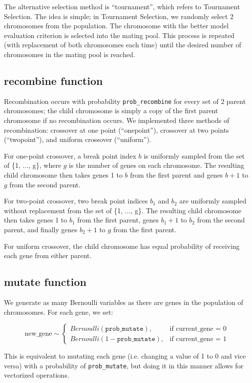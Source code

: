 \documentclass[11pt]{article}
\begin{document}
The alternative selection method is ``tournament'', which refers to Tournament Selection. The idea is simple; in Tournament Selection, we randomly select 2 chromosomes from the population. The chromosome with the better model evaluation criterion is selected into the mating pool. This process is repeated (with replacement of both chromosomes each time) until the desired number of chromosomes in the mating pool is reached.

\subsection*{recombine function}
Recombination occurs with probability \texttt{prob\_recombine} for every set of 2 parent chromosomes; the child chromosome is simply a copy of the first parent chromosome if no recombination occurs. We implemented three methods of recombination: crossover at one point (``onepoint''), crossover at two points (``twopoint''), and uniform crossover (``uniform'').

For one-point crossover, a break point index $b$ is uniformly sampled from the set of \{1, ..., g\}, where $g$ is the number of genes on each chromosome. The resulting child chromosome then takes genes 1 to $b$ from the first parent and genes $b+1$ to $g$ from the second parent.

For two-point crossover, two break point indices $b_1$ and $b_2$ are uniformly sampled without replacement from the set of \{1, ..., g\}. The resulting child chromosome then takes genes 1 to $b_1$ from the first parent, genes $b_1+1$ to $b_2$ from the second parent, and finally genes $b_2+1$ to $g$ from the first parent.

For uniform crossover, the child chromosome has equal probability of receiving each gene from either parent.

\subsection*{mutate function}
We generate as many Bernoulli variables as there are genes in the population of chromosomes. For each gene, we set:

\[
\text{new\_gene} \sim
\begin{cases}
Bernoulli(\texttt{prob\_mutate}), & \text{if current\_gene = 0}\\
Bernoulli(1-\texttt{prob\_mutate}), & \text{if current\_gene = 1}
\end{cases}
\]

This is equivalent to mutating each gene (i.e. changing a value of 1 to 0 and vice versa) with a probability of \texttt{prob\_mutate}, but doing it in this manner allows for vectorized operations.
\end{document}
